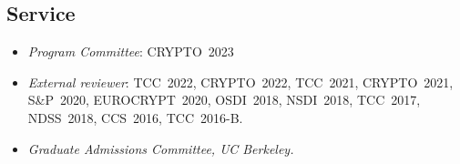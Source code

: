 \documentclass[11pt]{article}
\begin{document}
\begin{cv}{\vspace{-5em}}
{\section*{Service}}
  \begin{itemize}
    \small
    \item [] \emph{Program Committee}: CRYPTO~2023
    \item[] \emph{External reviewer}:
      TCC~2022,
      CRYPTO~2022,
      TCC~2021,
      CRYPTO~2021,
      S\&P~2020,
      EUROCRYPT~2020,
      OSDI~2018,
      NSDI~2018,
      TCC~2017,
      NDSS~2018,
      CCS~2016,
      TCC~2016-B.

    \item[] \emph{Graduate Admissions Committee, UC Berkeley.}
  \end{itemize}
\end{cv}
\end{document}
